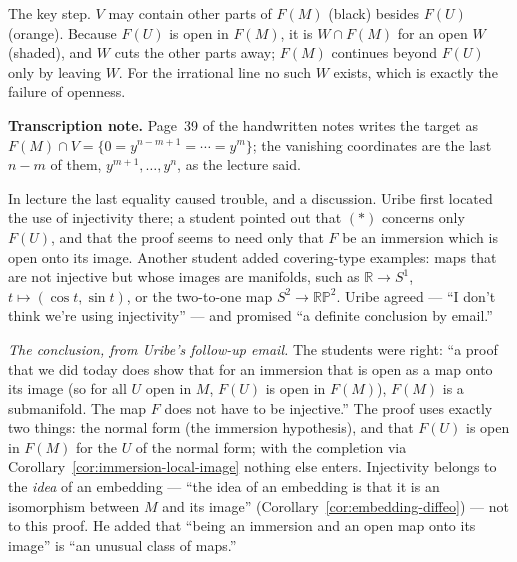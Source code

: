 \documentclass[11pt]{report}
\begin{document}
\begin{center}
\end{center}

The key step. $V$ may contain other parts of $F(M)$ (black) besides $F(U)$ (orange). Because $F(U)$ is open in $F(M)$, it is $W \cap F(M)$ for an open $W$ (shaded), and $W$ cuts the other parts away; $F(M)$ continues beyond $F(U)$ only by leaving $W$. For the irrational line no such $W$ exists, which is exactly the failure of openness.

\textbf{Transcription note.} Page~39 of the handwritten notes writes the target as $F(M) \cap V = \{0 = y^{n-m+1} = \cdots = y^m\}$; the vanishing coordinates are the last $n - m$ of them, $y^{m+1}, \ldots, y^n$, as the lecture said.

\begin{rembox}\label{rem:where-injectivity-used}
In lecture the last equality caused trouble, and a discussion. Uribe first located the use of injectivity there; a student pointed out that $(*)$ concerns only $F(U)$, and that the proof seems to need only that $F$ be an immersion which is open onto its image. Another student added covering-type examples: maps that are not injective but whose images are manifolds, such as $\mathbb{R} \to S^1$, $t \mapsto (\cos t, \sin t)$, or the two-to-one map $S^2 \to \mathbb{RP}^2$. Uribe agreed --- ``I don't think we're using injectivity'' --- and promised ``a definite conclusion by email.''

\emph{The conclusion, from Uribe's follow-up email.} The students were right: ``a proof that we did today does show that for an immersion that is open as a map onto its image (so for all $U$ open in $M$, $F(U)$ is open in $F(M)$), $F(M)$ is a submanifold. The map $F$ does not have to be injective.'' The proof uses exactly two things: the normal form (the immersion hypothesis), and that $F(U)$ is open in $F(M)$ for the $U$ of the normal form; with the completion via Corollary~\ref{cor:immersion-local-image} nothing else enters. Injectivity belongs to the \emph{idea} of an embedding --- ``the idea of an embedding is that it is an isomorphism between $M$ and its image'' (Corollary~\ref{cor:embedding-diffeo}) --- not to this proof. He added that ``being an immersion and an open map onto its image'' is ``an unusual class of maps.\@''
\end{rembox}
\end{document}
